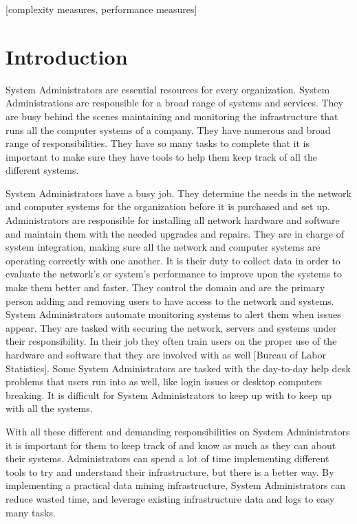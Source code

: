\documentclass{acm_proc_article-sp}
\begin{document}
[complexity measures, performance measures]



\section{Introduction}
System Administrators are essential resources for every organization.  System Administrations are responsible for a broad range of systems and services.  They are busy behind the scenes maintaining and monitoring the infrastructure that runs all the computer systems of a company. They have numerous and broad range of responsibilities.  They have so many tasks to complete that it is important to make sure they have tools to help them keep track of all the different systems.

System Administrators have a busy job.  They determine the needs in the network and computer systems for the organization before it is purchased and set up.  Administrators are responsible for installing all network hardware and software and maintain them with the needed upgrades and repairs.  They are in charge of system integration, making sure all the network and computer systems are operating correctly with one another.  It is their duty to collect data in order to evaluate the network’s or system’s performance to improve upon the systems to make them better and faster.  They control the domain and are the primary person adding and removing users to have access to the network and systems.  System Administrators automate monitoring systems to alert them when issues appear.  They are tasked with securing the network, servers and systems under their responsibility.  In their job they often train users on the proper use of the hardware and software that they are involved with as well [Bureau of Labor Statistics].  Some System Administrators are tasked with the day-to-day help desk problems that users run into as well, like login issues or desktop computers breaking.  It is difficult for System Administrators to keep up with to keep up with all the systems.

With all these different and demanding responsibilities on System Administrators it is important for them to keep track of and know as much as they can about their systems.  Administrators can spend a lot of time implementing different tools to try and understand their infrastructure, but there is a better way.  By implementing a practical data mining infrastructure, System Administrators can reduce wasted time, and leverage existing infrastructure data and logs to easy many tasks.
\end{document}
